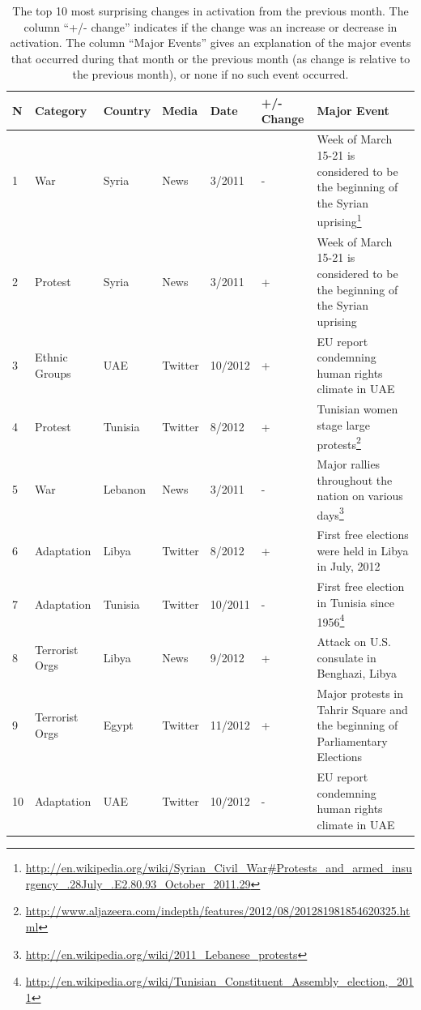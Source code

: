 \begin{table}[t]
\centering
\begin{tabularx}{\textwidth}{|m{.3cm}| l| l| l| l| m{.7cm}|  X |}
  \hline
 N & Category & Country & Media & Date & +/- Change & Major Event \\ 
  \hline
1 & War & Syria & News & 3/2011 & - & Week of March 15-21 is considered to be the beginning of the Syrian uprising\footnote{\url{http://en.wikipedia.org/wiki/Syrian_Civil_War#Protests_and_armed_insurgency_.28July_.E2.80.93_October_2011.29}} \\   \hline
  2 & Protest & Syria & News & 3/2011 & + &Week of March 15-21 is considered to be the beginning of the Syrian uprising \\   \hline
  3 & Ethnic Groups & UAE & Twitter & 10/2012 & + & EU report condemning human rights climate in UAE \\   \hline
  4 & Protest & Tunisia & Twitter & 8/2012 & + & Tunisian women stage large protests\footnote{\url{http://www.aljazeera.com/indepth/features/2012/08/201281981854620325.html}} \\   \hline
  5 & War & Lebanon & News & 3/2011 &  - & Major rallies throughout the nation on various days\footnote{\url{http://en.wikipedia.org/wiki/2011_Lebanese_protests}}\\   \hline
  6 & Adaptation & Libya & Twitter & 8/2012 & + & First free elections were held in Libya in July, 2012   \\ \hline
  7 & Adaptation & Tunisia & Twitter & 10/2011 &  - & First free election in Tunisia since 1956\footnote{\url{http://en.wikipedia.org/wiki/Tunisian_Constituent_Assembly_election,_2011}} \\   \hline
  8 & Terrorist Orgs & Libya & News & 9/2012& + & Attack on U.S. consulate in Benghazi, Libya \\   \hline 
  9 & Terrorist Orgs & Egypt & Twitter & 11/2012 & + & Major protests in Tahrir Square and the beginning of Parliamentary Elections \\  \hline 
  10 & Adaptation & UAE & Twitter & 10/2012 &  - & EU report condemning human rights climate in UAE  \\ 
   \hline
\end{tabularx}
\caption{The top 10 most surprising changes in activation from the previous month.  The column ``+/- change'' indicates if the change was an increase or decrease in activation.  The column ``Major Events'' gives an explanation of the major events that occurred during that month or the previous month (as change is relative to the previous month), or none if no such event occurred.}
\label{tab:events}
\end{table}

